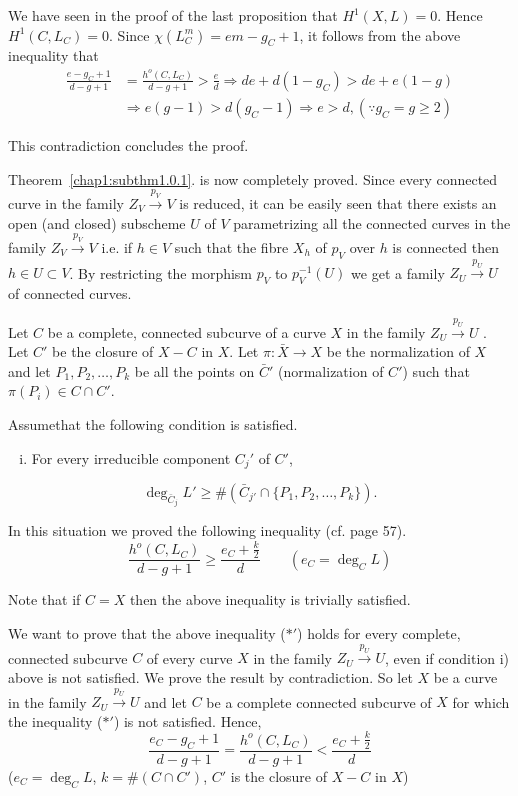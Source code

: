 {\noindent
We have seen in the proof of the last proposition that $H^1
(X,L)=0$. Hence $H^1 (C,L_C) = 0$. Since $\chi (L_C^m) = em - g_C+ 1$,
it follows from the above inequality that 
\begin{align*}
\frac{e-g_C+ 1}{d - g+ 1} & = \frac{h^o (C,L_C)}{d-g+1} > \frac{e}{d}
\Rightarrow de+d (1 - g_C) > de + e (1-g)\\ 
&  \Rightarrow e( g-1) > d (g_C -1) \Rightarrow e>d, (\because g_C = g
\geq 2) 
\end{align*}

\noindent
This contradiction concludes the proof.
 
Theorem~\ref{chap1:subthm1.0.1}. is now completely proved. Since every
connected 
curve in the family $Z_V \xrightarrow{p_V} V$  is reduced, it can be
easily seen that there exists an open (and closed) subscheme $U$ of
$V$ parametrizing all the connected curves in the family $Z_V
\xrightarrow{p_V} V$ i.e. if $h \in V$  such that the fibre
$X_h$ of $p_V$ over $h$ is connected then $h \in U \subset
V$. By restricting the morphism $p_V$ to $p_V^{-1} (U)$ we get a
family $Z_U \xrightarrow{p_U} U$ of connected curves. 

Let $C$ be a complete, connected subcurve of a curve $X$ in the family
$Z_U \xrightarrow{p_U} U$ . Let $C'$ be the closure of $X-C$ in
$X$. Let $\pi : \bar{X} \to X$ be the normalization of $X$ and let
$P_1, P_2 , \ldots , P_k$ be all the  points on $\bar{C}'$
(normalization of $C'$) such that $\pi (P_i) \in C \cap C'$.  

\noindent
Assume\pageoriginale that the following condition is satisfied.
\begin{enumerate}[i)]
\item For every irreducible component $C_j'$ of $C'$,
\end{enumerate}
$$
\deg _{\bar{C}_j} L' \geq \# (\bar{C}_{j'} \cap \{P_1, P_2, \ldots ,P_k\}).
$$

In this situation we proved the following inequality (cf. page 57).
\begin{equation*}
\frac{h^o (C,L_C)}{d-g+1} \geq \frac{e_C + \frac{k}{2}}{d} \qquad (e_C
= \deg _C L) \tag{$*'$} 
\end{equation*}

\noindent
Note that if $C= X$ then the above inequality is trivially satisfied.

We want to prove that the above inequality ($*'$) holds for every
complete, connected subcurve $C$ of every curve $X$ in the family $Z_U
\xrightarrow{p_U} U$, even if condition i) above is not
satisfied. We prove the result by contradiction. So let $X$ be a curve
in the family $Z_U \xrightarrow{p_U} U$  and let $C$ be a complete
connected subcurve of $X$ for which the inequality ($*'$) is not
satisfied. Hence, 
\begin{equation*}
\frac{e_C - g_C +1}{d-g+1} = \frac{h^o (C, L_C)}{d-g+1} < \frac{e_C +
  \frac{k}{2}}{d} \tag{1}\label{c1:eqq1} 
\end{equation*}
($e_C = \deg _C L$, $k = \# (C\cap C')$, $C'$ is the closure of $X-C$
in $X$) 

}
